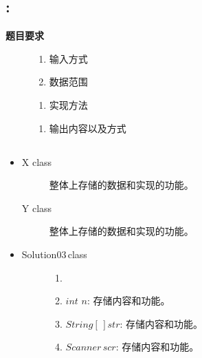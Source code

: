 \documentclass{article}
\begin{document}
\subsection{:}
\noindent\kaishu \textbf{题目要求}
\begin{description}
	\item [\kaishu输入]
	\begin{enumerate}
		\item \kaishu 输入方式
		\item \kaishu 数据范围
	\end{enumerate}
	\item [\kaishu实现]
	\begin{enumerate}
		\item 实现方法
		\end{enumerate}
	\item [\kaishu输出]
	\begin{enumerate}
		\item []\kaishu 输出内容以及方式
	\end{enumerate}
\end{description}

\subsection{}
\begin{itemize}
	\item{}
	\begin{description}
		\item[X\,\,class]\kaishu 整体上存储的数据和实现的功能。
		\item[Y\,\,class]\kaishu 整体上存储的数据和实现的功能。
	\end{description}
	\item{}
	\begin{description}
		\item[Solution03\,class]
		\begin{enumerate}
			\item[] \hspace{2pt}
			\item \kaishu $int\,\,n:$\,存储内容和功能。
			\item \kaishu $String[\,]str:$\,存储内容和功能。
			\item \kaishu $Scanner\,scr:$\,存储内容和功能。
		\end{enumerate}
	\end{description}
\end{itemize}
\end{document}
